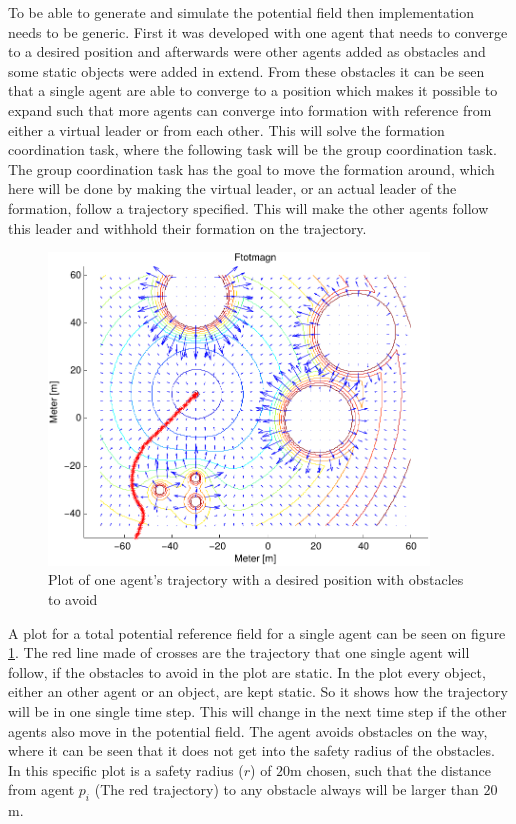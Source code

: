 To be able to generate and simulate the potential field then implementation needs to be generic. First it was developed with one agent that needs to converge to a desired position and afterwards were other agents added as obstacles and some static objects were added in extend. From these obstacles it can be seen that a single agent are able to converge to a position which makes it possible to expand such that more agents can converge into formation with reference from either a virtual leader or from each other. This will solve the formation coordination task, where the following task will be the group coordination task. The group coordination task has the goal to move the formation around, which here will be done by making the virtual leader, or an actual leader of the formation, follow a trajectory specified. This will make the other agents follow this leader and withhold their formation on the trajectory.
\begin{figure}[htbp]
  \includegraphics[width=0.9\textwidth]{fig/ftotmagnfigpdf1}
  \caption{Plot of one agent's trajectory with a desired position with obstacles to avoid}
  \label{fig:potfieldagenti}
\end{figure}
A plot for a total potential reference field for a single agent can be seen on figure \ref{fig:potfieldagenti}. The red line made of crosses are the trajectory that one single agent will follow, if the obstacles to avoid in the plot are static. In the plot every object, either an other agent or an object, are kept static. So it shows how the trajectory will be in one single time step. This will change in the next time step if the other agents also move in the potential field. The agent avoids obstacles on the way, where it can be seen that it does not get into the safety radius of the obstacles. In this specific plot is a safety radius ($r$) of $20$m chosen, such that the distance from agent $p_i$ (The red trajectory) to any obstacle always will be larger than $20$m.
